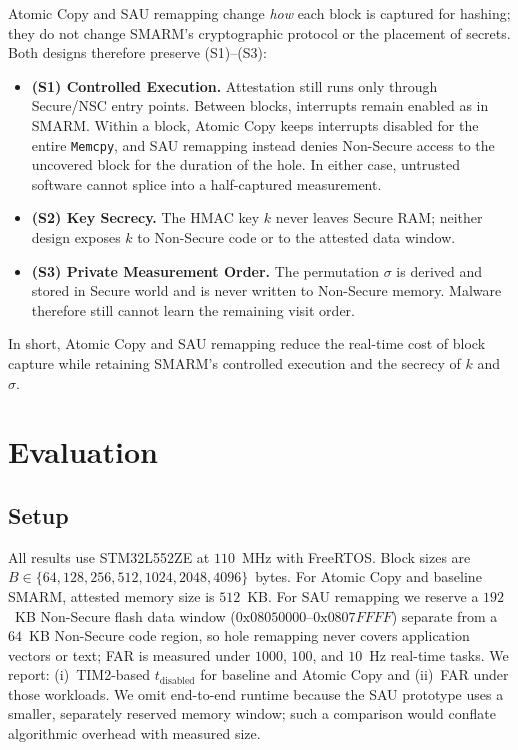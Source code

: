 \documentclass[conference]{IEEEtran}
\newcommand{\tdis}{$t_{\mathrm{disabled}}$\xspace}
\newcommand{\FAR}{FAR\xspace}
\begin{document}
Atomic Copy and SAU remapping change \emph{how} each block is captured
for hashing; they do not change SMARM's cryptographic protocol or the
placement of secrets. Both designs therefore preserve
(S1)--(S3):
\begin{itemize}
  \item \textbf{(S1) Controlled Execution.}
    Attestation still runs only through Secure/NSC entry points.
    Between blocks, interrupts remain enabled as in SMARM.
    Within a block, Atomic Copy keeps interrupts disabled for the
    entire \texttt{Memcpy}, and SAU remapping instead denies
    Non-Secure access to the uncovered block for the duration of the
    hole. In either case, untrusted software cannot splice into a
    half-captured measurement.
  \item \textbf{(S2) Key Secrecy.}
    The HMAC key $k$ never leaves Secure RAM; neither design exposes
    $k$ to Non-Secure code or to the attested data window.
  \item \textbf{(S3) Private Measurement Order.}
    The permutation $\sigma$ is derived and stored in Secure world and
    is never written to Non-Secure memory. Malware therefore still
    cannot learn the remaining visit order.
\end{itemize}
In short, Atomic Copy and SAU remapping reduce the real-time cost of
block capture while retaining SMARM's controlled execution and the
secrecy of $k$ and $\sigma$.

\section{Evaluation}
\label{sec:eval}

\subsection{Setup}

All results use STM32L552ZE at $110$~MHz with FreeRTOS.
Block sizes are $B\in\{64,128,256,512,1024,2048,4096\}$~bytes.
For Atomic Copy and baseline SMARM, attested memory size is $512$~KB.
For SAU remapping we reserve a $192$~KB Non-Secure flash data window
($0\mathrm{x}08050000$--$0\mathrm{x}0807FFFF$) separate from a
$64$~KB Non-Secure code region, so hole remapping never covers
application vectors or text; FAR is measured under $1000$, $100$, and
$10$~Hz real-time tasks.
We report: (i)~TIM2-based \tdis for baseline and Atomic Copy and
(ii)~\FAR under those workloads. We omit end-to-end runtime because the
SAU prototype uses a smaller, separately reserved memory window; such a
comparison would conflate algorithmic overhead with measured size.
\end{document}
